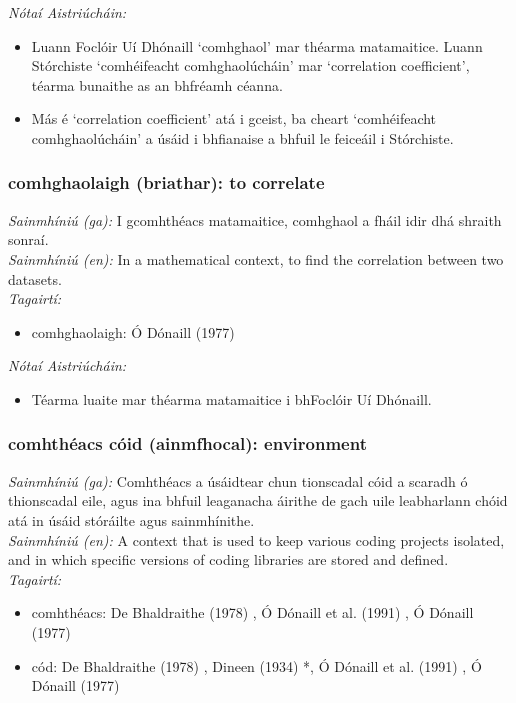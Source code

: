  \noindent \textit{Nótaí Aistriúcháin:}
\begin{itemize}
	\item Luann Foclóir Uí Dhónaill `comhghaol' mar théarma matamaitice. Luann Stórchiste `comhéifeacht comhghaolúcháin' mar `correlation coefficient', téarma bunaithe as an bhfréamh céanna.
	\item Más é `correlation coefficient' atá i gceist, ba cheart `comhéifeacht comhghaolúcháin' a úsáid i bhfianaise a bhfuil le feiceáil i Stórchiste.
\end{itemize}


\subsubsection*{comhghaolaigh (briathar): to correlate}
 \noindent \textit{Sainmhíniú (ga):} I gcomhthéacs matamaitice, comhghaol a fháil idir dhá shraith sonraí.
\\
 \noindent \textit{Sainmhíniú (en):} In a mathematical context, to find the correlation between two datasets.
\\
 \noindent \textit{Tagairtí:}
\begin{itemize}
	\item comhghaolaigh: Ó Dónaill (1977) \cite{odonaill}
\end{itemize}

 \noindent \textit{Nótaí Aistriúcháin:}
\begin{itemize}
	\item Téarma luaite mar théarma matamaitice i bhFoclóir Uí Dhónaill.
\end{itemize}


\subsubsection*{comhthéacs cóid (ainmfhocal): environment}
 \noindent \textit{Sainmhíniú (ga):} Comhthéacs a úsáidtear chun tionscadal cóid a scaradh ó thionscadal eile, agus ina bhfuil leaganacha áirithe de gach uile leabharlann chóid atá in úsáid stóráilte agus sainmhínithe.
\\
 \noindent \textit{Sainmhíniú (en):} A context that is used to keep various coding projects isolated, and in which specific versions of coding libraries are stored and defined.
\\
 \noindent \textit{Tagairtí:}
\begin{itemize}
	\item comhthéacs: De Bhaldraithe (1978) \cite{de-bhaldraithe}, Ó Dónaill et al. (1991) \cite{focloir-beag}, Ó Dónaill (1977) \cite{odonaill}
	\item cód: De Bhaldraithe (1978) \cite{de-bhaldraithe}, Dineen (1934) \cite{dineen}*, Ó Dónaill et al. (1991) \cite{focloir-beag}, Ó Dónaill (1977) \cite{odonaill}
\end{itemize}

